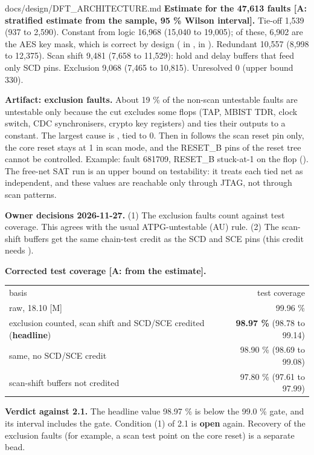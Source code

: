 \begin{relocated}{docs/design/DFT_ARCHITECTURE.md}
\textbf{Estimate for the 47,613 faults {[}A: stratified estimate from
the sample, 95 \% Wilson interval{]}.} Tie-off 1,539 (937 to 2,590).
Constant from logic 16,968 (15,040 to 19,005); of these, 6,902 are the
AES key mask, which is correct by design ( in
,  in
). Redundant 10,557 (8,998 to 12,375).
Scan shift 9,481 (7,658 to 11,529): hold and delay buffers that feed
only SCD pins. Exclusion 9,068 (7,465 to 10,815). Unresolved 0 (upper
bound 330).

\textbf{Artifact: exclusion faults.} About 19 \% of the non-scan
untestable faults are untestable only because the cut excludes some
flops (TAP, MBIST TDR, clock switch, CDC synchronisers, crypto key
registers) and ties their outputs to a constant. The largest cause is
, tied to 0. Then  in
 follows the scan reset pin only, the core
reset stays at 1 in scan mode, and the RESET\_B pins of the reset tree
cannot be controlled. Example: fault 681709, RESET\_B stuck-at-1 on the
flop  (). The free-net SAT run is an upper
bound on testability: it treats each tied net as independent, and these
values are reachable only through JTAG, not through scan patterns.

\textbf{Owner decisions 2026-11-27.} (1) The exclusion faults count
against test coverage. This agrees with the usual ATPG-untestable (AU)
rule. (2) The scan-shift buffers get the same chain-test credit as the
SCD and SCE pins (this credit needs ).

\textbf{Corrected test coverage {[}A: from the estimate{]}.}

\begin{tabular}{lr}
basis & test coverage \\
raw, 18.10 {[}M{]} & 99.96 \% \\
exclusion counted, scan shift and SCD/SCE credited (\textbf{headline}) & \textbf{98.97 \%} (98.78 to 99.14) \\
same, no SCD/SCE credit & 98.90 \% (98.69 to 99.08) \\
scan-shift buffers not credited & 97.80 \% (97.61 to 97.99) \\
\end{tabular}

\textbf{Verdict against 2.1.} The headline value 98.97 \% is below the
99.0 \% gate, and its interval includes the gate. Condition (1) of 2.1
is \textbf{open} again. Recovery of the exclusion faults (for example,
a scan test point on the core reset) is a separate bead.


\end{relocated}
